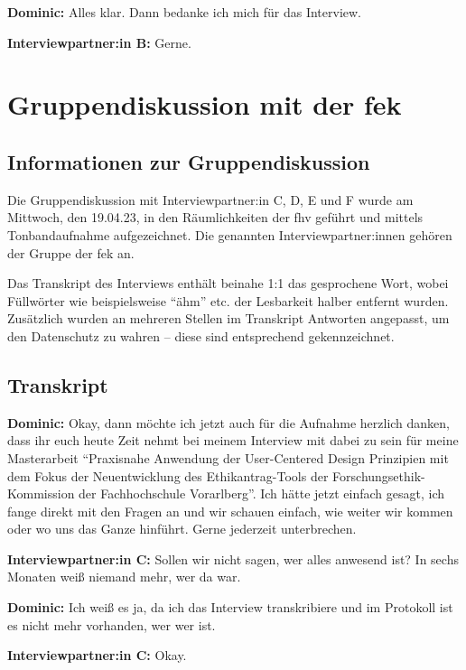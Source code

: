 \documentclass[a4paper,12pt,twoside]{scrreprt}
\begin{document}
\textbf{Dominic:} Alles klar. Dann bedanke ich mich für das Interview.

\textbf{Interviewpartner:in B:} Gerne.

\chapter{Gruppendiskussion mit der \acs{fek}}
\label{appendix:gruppendiskussion}

\section{Informationen zur Gruppendiskussion}
\label{appendix:gruppendiskussion-infos}

Die Gruppendiskussion mit Interviewpartner:in C, D, E und F wurde am Mittwoch, den 19.04.23, in den Räumlichkeiten der \ac{fhv} geführt und mittels Tonbandaufnahme aufgezeichnet. Die genannten Interviewpartner:innen gehören der Gruppe der \acl{fek} an.

Das Transkript des Interviews enthält beinahe 1:1 das gesprochene Wort, wobei Füllwörter wie beispielsweise \enquote{ähm} etc. der Lesbarkeit halber entfernt wurden. Zusätzlich wurden an mehreren Stellen im Transkript Antworten angepasst, um den Datenschutz zu wahren -- diese sind entsprechend gekennzeichnet.

\section{Transkript}
\label{appendix:gruppendiskussion-transkript}

\textbf{Dominic:} Okay, dann möchte ich jetzt auch für die Aufnahme herzlich danken, dass ihr euch heute Zeit nehmt bei meinem Interview mit dabei zu sein für meine Masterarbeit \enquote{Praxisnahe Anwendung der User-Centered Design Prinzipien mit dem Fokus der Neuentwicklung des Ethikantrag-Tools der Forschungsethik-Kommission der Fachhochschule Vorarlberg}. Ich hätte jetzt einfach gesagt, ich fange direkt mit den Fragen an und wir schauen einfach, wie weiter wir kommen oder wo uns das Ganze hinführt. Gerne jederzeit unterbrechen.

\textbf{Interviewpartner:in C:} Sollen wir nicht sagen, wer alles anwesend ist? In sechs Monaten weiß niemand mehr, wer da war.

\textbf{Dominic:} Ich weiß es ja, da ich das Interview transkribiere und im Protokoll ist es nicht mehr vorhanden, wer wer ist.

\textbf{Interviewpartner:in C:} Okay.
\end{document}
